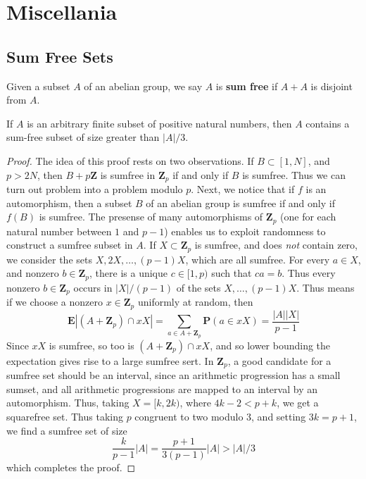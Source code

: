 \chapter{Miscellania}

\section{Sum Free Sets}

Given a subset $A$ of an abelian group, we say $A$ is {\bf sum free} if $A + A$ is disjoint from $A$.

\begin{theorem}
    If $A$ is an arbitrary finite subset of positive natural numbers, then $A$ contains a sum-free subset of size greater than $|A|/3$.
\end{theorem}
\begin{proof}
    The idea of this proof rests on two observations. If $B \subset [1,N]$, and $p > 2N$, then $B + p \mathbf{Z}$ is sumfree in $\mathbf{Z}_p$ if and only if $B$ is sumfree. Thus we can turn out problem into a problem modulo $p$. Next, we notice that if $f$ is an automorphism, then a subset $B$ of an abelian group is sumfree if and only if $f(B)$ is sumfree. The presense of many automorphisms of $\mathbf{Z}_p$ (one for each natural number between $1$ and $p-1$) enables us to exploit randomness to construct a sumfree subset in $A$. If $X \subset \mathbf{Z}_p$ is sumfree, and does {\it not} contain zero, we consider the sets $X,2X, \dots, (p-1)X$, which are all sumfree. For every $a \in X$, and nonzero $b \in \mathbf{Z}_p$, there is a unique $c \in [1,p)$ such that $ca = b$. Thus every nonzero $b \in \mathbf{Z}_p$ occurs in $|X|/(p-1)$ of the sets $X,\dots, (p-1)X$. Thus means if we choose a nonzero $x \in \mathbf{Z}_p$ uniformly at random, then
    \[ \mathbf{E} |(A + \mathbf{Z}_p) \cap xX| = \sum_{a \in A + \mathbf{Z}_p} \mathbf{P}(a \in xX) = \frac{|A| |X|}{p-1} \]
    Since $xX$ is sumfree, so too is $(A + \mathbf{Z}_p) \cap xX$, and so lower bounding the expectation gives rise to a large sumfree sert. In $\mathbf{Z}_p$, a good candidate for a sumfree set should be an interval, since an arithmetic progression has a small sumset, and all arithmetic progressions are mapped to an interval by an automorphism. Thus, taking $X = [k,2k)$, where $4k - 2 < p + k$, we get a squarefree set. Thus taking $p$ congruent to two modulo 3, and setting $3k = p + 1$, we find a sumfree set of size
    \[ \frac{k}{p-1} |A| = \frac{p + 1}{3(p-1)} |A| > |A|/3 \]
    which completes the proof.
\end{proof}


